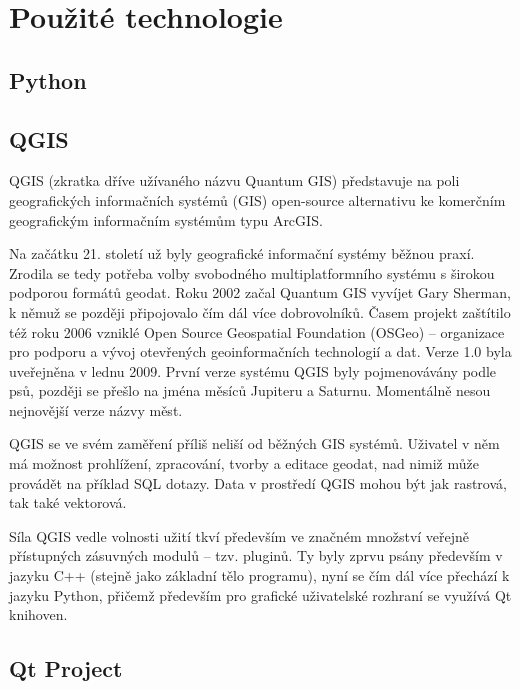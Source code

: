 \chapter{Použité technologie}
\label{3-technologie}




\section{Python}
\label{python}

 


\section{QGIS}
\label{qgis}

QGIS (zkratka dříve užívaného názvu Quantum GIS) představuje na poli geografických informačních systémů (GIS) open-source alternativu ke komerčním geografickým informačním systémům typu ArcGIS. 

Na začátku 21. století už byly geografické informační systémy běžnou praxí. Zrodila se tedy potřeba volby svobodného multiplatformního systému s širokou podporou formátů geodat. Roku 2002 začal Quantum GIS vyvíjet Gary Sherman, k němuž se později připojovalo čím dál více dobrovolníků. Časem projekt zaštítilo též roku 2006 vzniklé Open Source Geospatial Foundation (OSGeo) – organizace pro podporu a vývoj otevřených geoinformačních technologií a dat. Verze 1.0 byla uveřejněna v lednu 2009. 
První verze systému QGIS byly pojmenovávány podle psů, později se přešlo na jména měsíců Jupiteru a Saturnu. Momentálně nesou nejnovější verze názvy měst. 

QGIS se ve svém zaměření příliš neliší od běžných GIS systémů. Uživatel v něm má možnost prohlížení, zpracování, tvorby a editace geodat, nad nimiž může provádět na příklad SQL dotazy. Data v prostředí QGIS mohou být jak rastrová, tak také vektorová. 

Síla QGIS vedle volnosti užití tkví především ve značném množství veřejně přístupných zásuvných modulů – tzv. pluginů. Ty byly zprvu psány především v jazyku C++ (stejně jako základní tělo programu), nyní se čím dál více přechází k jazyku Python, přičemž především pro grafické uživatelské rozhraní se využívá Qt knihoven. 



\section{Qt Project}
\label{qt}